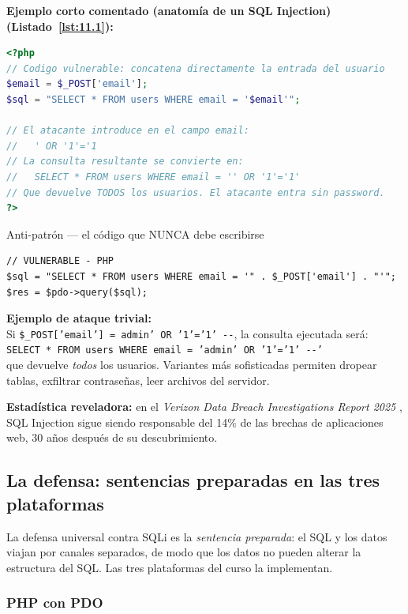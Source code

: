 \textbf{Ejemplo corto comentado (anatomía de un SQL Injection) (Listado~\ref{lst:11.1}):}
\begin{lstlisting}[language=PHP,numbers=none,caption={Ejemplo de PHP},label=lst:11.1]
<?php
// Codigo vulnerable: concatena directamente la entrada del usuario
$email = $_POST['email'];
$sql = "SELECT * FROM users WHERE email = '$email'";

// El atacante introduce en el campo email:
//   ' OR '1'='1
// La consulta resultante se convierte en:
//   SELECT * FROM users WHERE email = '' OR '1'='1'
// Que devuelve TODOS los usuarios. El atacante entra sin password.
?>
\end{lstlisting}


\begin{cajaadvertencia}{Anti-patrón --- el código que NUNCA debe escribirse}
\begin{lstlisting}[style=php,numbers=none,caption={Ejemplo de PHP},label=lst:11.2]
// VULNERABLE - PHP
$sql = "SELECT * FROM users WHERE email = '" . $_POST['email'] . "'";
$res = $pdo->query($sql);
\end{lstlisting}
\textbf{Ejemplo de ataque trivial:}\\
Si \texttt{\$\_POST['email'] = admin' OR '1'='1' -{}-}, la consulta
ejecutada será:\\
\texttt{SELECT * FROM users WHERE email = 'admin' OR '1'='1' -{}-'}\\
que devuelve \emph{todos} los usuarios. Variantes más sofisticadas
permiten dropear tablas, exfiltrar contraseñas, leer archivos del
servidor.

\textbf{Estadística reveladora:} en el \emph{Verizon Data Breach
Investigations Report 2025} \cite{verizon2025dbir}, SQL Injection
sigue siendo responsable del 14\% de las brechas de aplicaciones web,
30 años después de su descubrimiento.
\end{cajaadvertencia}

\subsection{La defensa: sentencias preparadas en las tres plataformas}

La defensa universal contra SQLi es la \emph{sentencia
preparada}: el SQL y los datos viajan por canales separados, de
modo que los datos no pueden alterar la estructura del SQL. Las
tres plataformas del curso la implementan.


\subsubsection{PHP con PDO}

